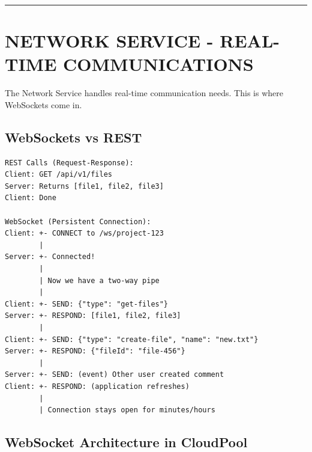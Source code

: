 \documentclass[11pt,a4paper]{report}
\begin{document}
\vfill\hrule\vfill



\part{NETWORK SERVICE - REAL-TIME COMMUNICATIONS}


The Network Service handles real-time communication needs. This is where WebSockets come in.


\chapter{WebSockets vs REST}


\begin{lstlisting}[language=text]
REST Calls (Request-Response):
Client: GET /api/v1/files
Server: Returns [file1, file2, file3]
Client: Done

WebSocket (Persistent Connection):
Client: +- CONNECT to /ws/project-123
        |
Server: +- Connected!
        |
        | Now we have a two-way pipe
        |
Client: +- SEND: {"type": "get-files"}
Server: +- RESPOND: [file1, file2, file3]
        |
Client: +- SEND: {"type": "create-file", "name": "new.txt"}
Server: +- RESPOND: {"fileId": "file-456"}
        |
Server: +- SEND: (event) Other user created comment
Client: +- RESPOND: (application refreshes)
        |
        | Connection stays open for minutes/hours
\end{lstlisting}


\chapter{WebSocket Architecture in CloudPool}
\end{document}

